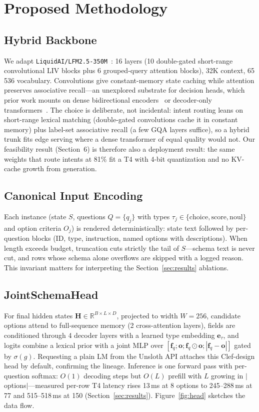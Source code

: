 \section{Proposed Methodology}
\subsection{Hybrid Backbone}
We adapt \texttt{LiquidAI/LFM2.5-350M}~\cite{liquid-lfm2}: 16 layers (10
double-gated short-range convolutional LIV blocks plus 6 grouped-query
attention blocks), 32K context, 65\,536 vocabulary. Convolutions give
constant-memory state caching while attention preserves associative recall---an
unexplored substrate for decision heads, which prior work mounts on dense
bidirectional encoders~\cite{convai-laya} or decoder-only
transformers~\cite{cloudflare-clef}. The choice is deliberate, not incidental:
intent routing leans on short-range lexical matching (double-gated
convolutions cache it in constant memory) plus label-set associative recall
(a few GQA layers suffice), so a hybrid trunk fits edge serving where a dense
transformer of equal quality would not. Our feasibility result (Section~6) is
therefore also a deployment result: the same weights that route intents at
81\% fit a T4 with 4-bit quantization and no KV-cache growth from generation.

\subsection{Canonical Input Encoding}
Each instance (state $S$, questions $Q=\{q_j\}$ with types
$\tau_j\in\{\text{choice},\text{score},\text{noul}\}$ and option criteria $O_j$)
is rendered deterministically: state text followed by per-question blocks
(ID, type, instruction, named options with descriptions). When length exceeds
budget, truncation cuts strictly the tail of $S$---schema text is never cut,
and rows whose schema alone overflows are skipped with a logged reason. This
invariant matters for interpreting the Section~\ref{sec:results} ablations.

\subsection{JointSchemaHead}
For final hidden states $\mathbf{H}\in\mathbb{R}^{B\times L\times D}$,
projected to width $W=256$, candidate options attend to full-sequence memory
(2 cross-attention layers), fields are conditioned through 4 decoder layers
with a learned type embedding $\mathbf{e}_{\tau}$, and logits combine a lexical
prior with a joint MLP over
$[\mathbf{f}_q; \mathbf{o}; \mathbf{f}_q\odot\mathbf{o};
|\mathbf{f}_q-\mathbf{o}|]$ gated by $\sigma(g)$. Requesting a plain LM from
the Unsloth API attaches this Clef-design head by default, confirming the
lineage. Inference is one forward pass with per-question softmax:
$O(1)$ decoding steps but $O(L)$ prefill with $L$ growing in $|$options$|$---measured
per-row T4 latency rises 13\,ms at 8 options to 245--288\,ms at 77 and
515--518\,ms at 150 (Section~\ref{sec:results}).
Figure~\ref{fig:head} sketches the data flow.



